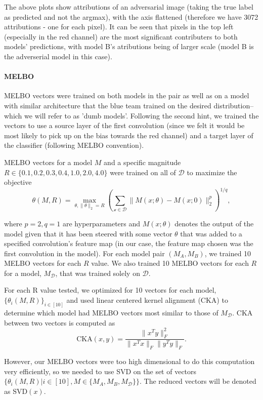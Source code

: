 \documentclass[letterpaper]{article} %
\begin{document}
The above plots show attributions of an adversarial image (taking the true label as predicted and not the argmax), with the axis flattened (therefore we have 3072 attributions - one for each pixel). It can be seen that pixels in the top left (especially in the red channel) are the most significant contributers to both models' predictions, with model B's atributions being of larger scale (model B is the adverserial model in this case).


\paragraph{MELBO}
MELBO vectors were trained on both models in the pair as well as on a model with similar architecture that the blue team trained on the desired distribution--which we will refer to as 'dumb models'. Following the second hint, we trained the vectors to use a source layer of the first convolution (since we felt it would be most likely to pick up on the bias towards the red channel) and a target layer of the classifier (following MELBO convention). 

MELBO vectors for a model $M$ and a specific magnitude $R\in\{0.1,0.2,0.3,0.4,1.0,2.0,4.0\}$ were trained on all of $\mathcal{D}$ to maximize the objective
$$ \theta(M,R) =  \max_{\theta, \|\theta\|_2 = R} \left(\sum_{\mathcal{x \in D}} \| M(x;\theta) - M(x;0)\|^p_2\right)^{1/q},$$

where $p=2,q=1$ are hyperparameters and $M(x;\theta)$ denotes the output of the model given that it has been steered with some vector $\theta$ that was added to a specified convolution's feature map (in our case, the feature map chosen was the first convolution in the model). For each model pair $(M_A, M_B)$, we trained 10 MELBO vectors for each $R$ value. We also trained 10 MELBO vectors for each $R$ for a model, $M_\mathcal{D}$, that was trained solely on $\mathcal{D}$.

For each R value tested, we optimized for 10 vectors for each model, $\{\theta_i(M,R)\}_{i\in[10]}$ and used linear centered kernel alignment (CKA) to determine which model had MELBO vectors most similar to those of $M_\mathcal{D}$. CKA between two vectors is computed as
$$\text{CKA}(x,y) = \frac{\|x^Ty\|_F^2}{\|x^Tx\|_F \|y^Ty\|_F}.$$

However, our MELBO vectors were too high dimensional to do this computation very efficiently, so we needed to use SVD on the set of vectors $\{\theta_i(M,R) | i\in[10], M\in\{M_A, M_B, M_\mathcal{D}\}\}$. The reduced vectors will be denoted as $\text{SVD}(x)$.
\end{document}
